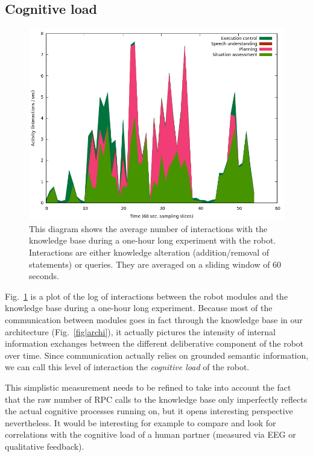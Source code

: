 \documentclass[letterpaper, 10 pt, conference]{ieeeconf}  %
\begin{document}
\subsection{Cognitive load}

\begin{figure}
        \centering
        \includegraphics[width=\columnwidth]{figs/cognitive_load.png}
        \caption{This diagram shows the average number of interactions with the
        knowledge base during a one-hour long experiment with the robot.
        Interactions are either knowledge alteration (addition/removal of
        statements) or queries. They are averaged on a sliding window of 60 seconds.}
        \label{fig|cognitiveload}
\end{figure}

Fig.~\ref{fig|cognitiveload} is a plot of the log of interactions between the
robot modules and the knowledge base during a one-hour long experiment. Because
most of the communication between modules goes in fact through the knowledge
base in our architecture (Fig.~\ref{fig|archi}), it actually pictures the
intensity of internal information exchanges between the different deliberative
component of the robot over time. Since communication actually relies on
grounded semantic information, we can call this level of interaction the
\emph{cognitive load} of the robot.

This simplistic measurement needs to be refined to take into account the fact
that the raw number of RPC calls to the knowledge base only imperfectly
reflects the actual cognitive processes running on, but it opens interesting
perspective nevertheless. It would be interesting for example to compare
and look for correlations with the cognitive load of a human partner (measured
via EEG or qualitative feedback).
\end{document}
